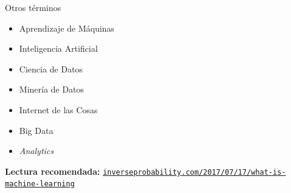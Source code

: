 \documentclass[9pt]{beamer}
\begin{document}
\begin{frame}{Otros términos}

  \begin{itemize}
    \item Aprendizaje de Máquinas
    \item Inteligencia Artificial
    \item Ciencia de Datos
    \item Minería de Datos
    \item Internet de las Cosas
    \item Big Data
    \item \emph{Analytics}
  \end{itemize}
  \vfill
\textbf{Lectura recomendada:} \href{https://inverseprobability.com/2017/07/17/what-is-machine-learning}{\tt inverseprobability.com/2017/07/17/what-is-machine-learning}

\end{frame}



\end{document}
